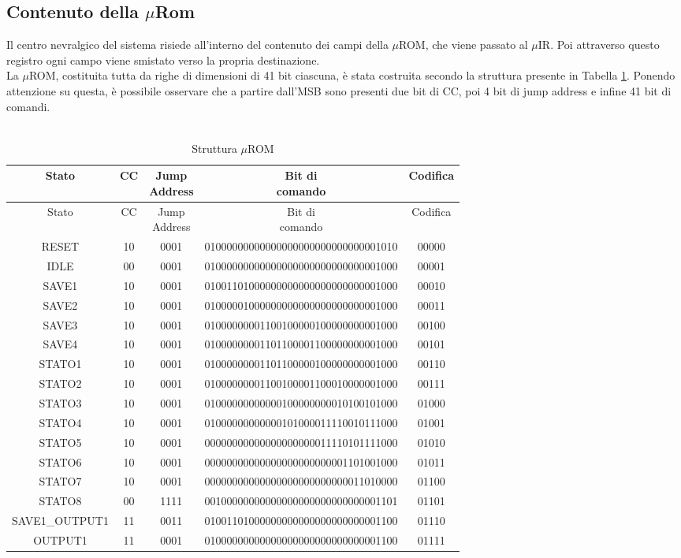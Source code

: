 \documentclass[a4paper, titlepage]{article}
\begin{document}
\subsection{Contenuto della $\mu$Rom}%
Il centro nevralgico del sistema risiede all'interno del contenuto dei campi della $\mu$ROM, che viene passato al $\mu$IR. Poi attraverso questo registro ogni campo viene smistato verso la propria destinazione.\\La $\mu$ROM, costituita tutta da righe di dimensioni di 41 bit ciascuna, è stata costruita secondo la struttura presente in Tabella \ref{tab:Struttura microROM}. Ponendo attenzione su questa, è possibile osservare che a partire dall'MSB sono presenti due bit di CC, poi 4 bit di jump address e infine 41 bit di comandi.\\\\
\begin{longtable}{*5c}
\caption{Struttura $\mu$ROM}
\label{tab:Struttura microROM}\\
\toprule
 Stato & CC & \thead{Jump\\Address} & \thead{Bit di\\comando} & Codifica \\
\midrule
\endfirsthead
 Stato & CC & \thead{Jump\\Address} & \thead{Bit di\\comando} & Codifica \\
\midrule
\endhead
\midrule
\endfoot
\bottomrule
\endlastfoot
RESET &	10 & 0001 &	01000000000000000000000000000001010 &00000\\
IDLE  &	00 & 0001 & 01000000000000000000000000000001000	&00001\\
SAVE1 & 10 & 0001 &	01001101000000000000000000000001000	&00010\\
SAVE2 & 10 & 0001 &	01000001000000000000000000000001000	&00011\\
SAVE3 & 10 & 0001 & 01000000001100100000100000000001000 &00100\\
SAVE4 & 10 & 0001 &	01000000001101100001100000000001000 &00101\\
STATO1 & 10	& 0001 & 01000000001101100000100000000001000 &00110\\
STATO2 & 10	& 0001 & 01000000001100100001100010000001000 &00111\\
STATO3 & 10	& 0001 & 01000000000000100000000010100101000 &01000\\
STATO4 & 10	& 0001 & 01000000000000101000011110010111000 &01001\\
STATO5 & 10	& 0001 & 00000000000000000000011110101111000 &01010\\
STATO6 & 10	& 0001 & 00000000000000000000000001101001000 &01011\\
STATO7 & 10	& 0001 & 00000000000000000000000000011010000 &01100\\
STATO8 & 00 & 1111 & 00100000000000000000000000000001101 &01101\\
SAVE1\_OUTPUT1 & 11	& 0011 & 01001101000000000000000000000001100 &01110\\
OUTPUT1&11&0001&01000000000000000000000000000001100&01111\\
\end{longtable}
\end{document}
